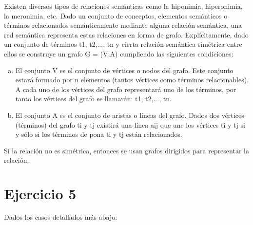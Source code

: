 \documentclass[a4paper,12pt,twoside,final,spanish]{article}
\begin{document}
Existen diversos tipos de relaciones semánticas como la hiponimia, hiperonimia, la meronimia, etc. Dado un conjunto de conceptos, elementos semánticos o términos relacionados semánticamente mediante alguna relación semántica, una red semántica representa estas relaciones en forma de grafo. Explícitamente, dado un conjunto de términos {t1, t2,..., tn} y cierta relación semántica simétrica entre ellos se construye un grafo G = (V,A) cumpliendo las siguientes condiciones:
\begin{enumerate}[a.]
\item El conjunto V es el conjunto de vértices o nodos del grafo. Este conjunto estará formado por n elementos (tantos vértices como términos relacionables). A cada uno de los vértices del grafo representará uno de los términos, por tanto los vértices del grafo se llamarán: t1, t2,..., tn.
\item El conjunto A es el conjunto de aristas o líneas del grafo. Dados dos vértices (términos) del grafo ti y tj existirá una línea aij que une los vértices ti y tj si y sólo si los términos de pona ti y tj están relacionados.
\end{enumerate}

Si la relación no es simétrica, entonces se usan grafos dirigidos para representar la relación.

\section*{Ejercicio 5}

Dados los casos detallados más abajo:
\end{document}
